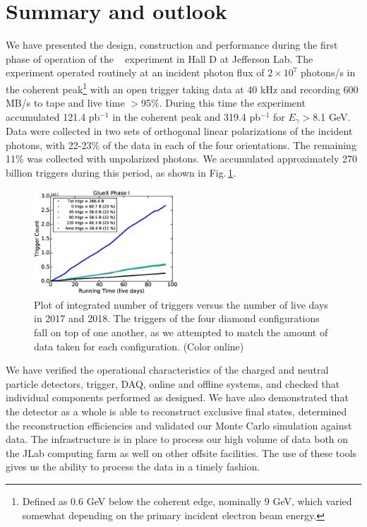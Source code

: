 
\section{Summary and outlook\label{sec:summary} }
We have presented the design, construction and performance during the first phase of operation of the  \gx~ experiment in Hall D at Jefferson Lab. The experiment operated routinely at an incident photon flux of $2\times 10^{7}$ photons/s in the coherent peak\footnote{Defined as 0.6 GeV below the coherent edge, nominally 9 GeV, which varied somewhat depending on the primary incident electron beam energy.} with an open trigger taking data at 40 kHz and recording 600 MB/s to tape and live time $>$95\%. During this time the experiment accumulated  121.4 pb$^{-1}$ in the coherent peak and 319.4 pb$^{-1}$ for $E_\gamma>$8.1 GeV. Data were collected in two sets of orthogonal linear polarizations of the incident photons, with 22-23\% of the data in each of the four orientations. The remaining 11\% was collected with unpolarized photons. We accumulated approximately 270 billion triggers during this period, as shown in Fig.\,\ref{fig:plot_rcdb3_phaseI}.  

\begin{figure}[tbh]\centering
\includegraphics[width=0.48\textwidth]{figures/plot_rcdb3_phaseI.eps}
\caption{\label{fig:plot_rcdb3_phaseI} 
Plot of integrated number of triggers versus the number of live days in 2017 and 2018. The triggers of the four diamond configurations fall on top of one another, as we attempted to match the amount of data taken for each configuration. 
(Color online)
 }
\end{figure}   

We have verified the operational characteristics of the charged and neutral particle detectors, trigger, DAQ, online and offline systems, and checked that individual components performed as designed. We have also demonstrated that the detector as a whole is able to reconstruct exclusive final states, determined the reconstruction efficiencies and validated our Monte Carlo simulation against data. The infrastructure is in place to process our high volume of data both on the JLab computing farm as well on other offsite facilities. The use of these tools gives us the ability to process the data in a timely fashion.


